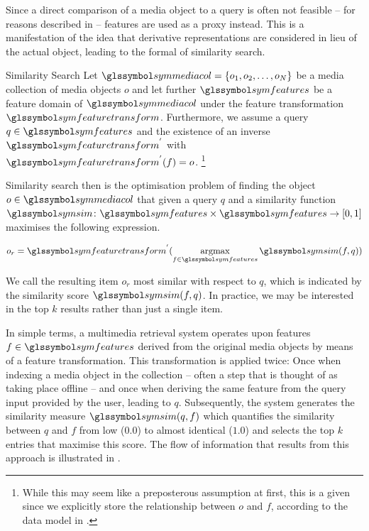 Since a direct comparison of a media object to a query is often not feasible -- for reasons described in  -- features are used as a proxy instead. This is a manifestation of the idea that derivative representations are considered in lieu of the actual object, leading to the formal  of similarity search.

\begin{definition}[label=definition:similarity_search]{Similarity Search}{}
    Let $\symmediacol = \lbrace o_1, o_2, \ldots, o_N \rbrace$ be a media collection of media objects $o$ and let further $\symfeatures$ be a feature domain of $\symmediacol$ under the feature transformation $\symfeaturetransform$. Furthermore, we assume a query $q \in \symfeatures$ and the existence of an inverse $\symfeaturetransform^{'}$ with $\symfeaturetransform^{'}(f) = o$. \footnote{While this may seem like a preposterous assumption at first, this is a given since we explicitly store the relationship between $o$ and $f$, according to the data model in .}

    Similarity search then is the optimisation problem of finding the object $o \in \symmediacol$ that given a query $q$ and a similarity function $\symsim \colon \symfeatures \times \symfeatures \rightarrow [0, 1]$ maximises the following expression.

    \begin{equation}
       o_r =  \symfeaturetransform^{'} (\argmax_{f \in \symfeatures} \symsim(f,q))
    \end{equation}
 
    We call the resulting item $o_r$ most similar with respect to $q$, which is indicated by the similarity score $\symsim(f,q)$. In practice, we may be interested in the top $k$ results rather than just a single item.
\end{definition}

In simple terms, a multimedia retrieval system operates upon features $f \in \symfeatures$ derived from the original media objects by means of a feature transformation. This transformation is applied twice: Once when indexing a media object in the collection -- often a step that is thought of as taking place offline -- and once when deriving the same feature from the query input provided by the user, leading to $q$. Subsequently, the system generates the similarity measure $\symsim(q,f)$ which quantifies the similarity between $q$ and $f$ from low ($0.0$) to almost identical ($1.0$) and selects the top $k$ entries that maximise this score. The flow of information that results from this approach is illustrated in . 


